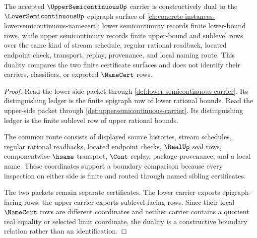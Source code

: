 \begin{theorem}
\label{thm:uppersemicontinuous-lower-dual}
The accepted $\UpperSemicontinuousUp$ carrier is constructively dual to the
$\LowerSemicontinuousUp$ epigraph surface of
\autoref{ch:concrete-instances-lowersemicontinuous-namecert}: lower
semicontinuity records finite lower-bound rows, while upper semicontinuity
records finite upper-bound and sublevel rows over the same kind of stream
schedule, regular rational readback, located endpoint check, transport,
replay, provenance, and local naming route. This duality compares the two
finite certificate surfaces and does not identify their carriers,
classifiers, or exported $\NameCert$ rows.
\end{theorem}
\begin{proof}
Read the lower-side packet through
\autoref{def:lower-semicontinuous-carrier}. Its distinguishing ledger is the
finite epigraph row of lower rational bounds. Read the upper-side packet
through \autoref{def:uppersemicontinuous-carrier}. Its distinguishing ledger
is the finite sublevel row of upper rational bounds.

The common route consists of displayed source histories, stream schedules,
regular rational readbacks, located endpoint checks, $\RealUp$ seal rows,
componentwise $\hsame$ transport, $\Cont$ replay, package provenance, and a
local name. These coordinates support a boundary comparison because every
inspection on either side is finite and routed through named sibling
certificates.

The two packets remain separate certificates. The lower carrier exports
epigraph-facing rows; the upper carrier exports sublevel-facing rows. Since
their local $\NameCert$ rows are different coordinates and neither carrier
contains a quotient real equality or selected limit coordinate, the duality is
a constructive boundary relation rather than an identification.
\end{proof}

